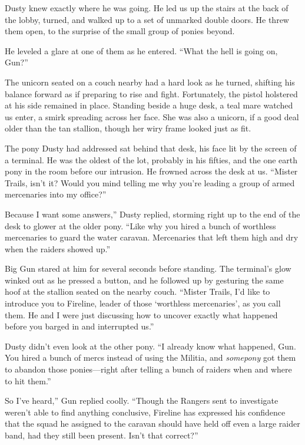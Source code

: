 Dusty knew exactly where he was going. He led us up the stairs at the back of the lobby, turned, and walked up to a set of unmarked double doors. He threw them open, to the surprise of the small group of ponies beyond.

He leveled a glare at one of them as he entered. “What the hell is going on, Gun?”

The unicorn seated on a couch nearby had a hard look as he turned, shifting his balance forward as if preparing to rise and fight. Fortunately, the pistol holstered at his side remained in place. Standing beside a huge desk, a teal mare watched us enter, a smirk spreading across her face. She was also a unicorn, if a good deal older than the tan stallion, though her wiry frame looked just as fit.

The pony Dusty had addressed sat behind that desk, his face lit by the screen of a terminal. He was the oldest of the lot, probably in his fifties, and the one earth pony in the room before our intrusion. He frowned across the desk at us. “Mister Trails, isn’t it? Would you mind telling me why you’re leading a group of armed mercenaries into my office?”

\leavevmode{}Because I want some answers,” Dusty replied, storming right up to the end of the desk to glower at the older pony. “Like why you hired a bunch of worthless mercenaries to guard the water caravan. Mercenaries that left them high and dry when the raiders showed up.”

Big Gun stared at him for several seconds before standing. The terminal’s glow winked out as he pressed a button, and he followed up by gesturing the same hoof at the stallion seated on the nearby couch. “Mister Trails, I’d like to introduce you to Fireline, leader of those ‘worthless mercenaries’, as you call them. He and I were just discussing how to uncover exactly what happened before you barged in and interrupted us.”

Dusty didn’t even look at the other pony. “I already know what happened, Gun. You hired a bunch of mercs instead of using the Militia, and \textit{somepony} got them to abandon those ponies—right after telling a bunch of raiders when and where to hit them.”

\leavevmode{}So I’ve heard,” Gun replied coolly. “Though the Rangers sent to investigate weren’t able to find anything conclusive, Fireline has expressed his confidence that the squad he assigned to the caravan should have held off even a large raider band, had they still been present. Isn’t that correct?”

